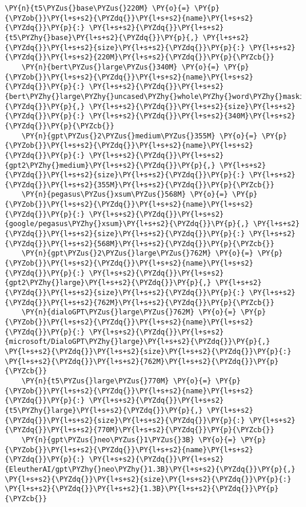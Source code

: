 \documentclass[11pt]{wseas}
\begin{document}
\begin{tcolorbox}[breakable, size=fbox, boxrule=1pt, pad at break*=1mm,colback=cellbackground, colframe=cellborder]
\begin{Verbatim}[commandchars=\\\{\}]
    \PY{n}{t5\PYZus{}base\PYZus{}220M} \PY{o}{=} \PY{p}{\PYZob{}}\PY{l+s+s2}{\PYZdq{}}\PY{l+s+s2}{name}\PY{l+s+s2}{\PYZdq{}}\PY{p}{:} \PY{l+s+s2}{\PYZdq{}}\PY{l+s+s2}{t5\PYZhy{}base}\PY{l+s+s2}{\PYZdq{}}\PY{p}{,} \PY{l+s+s2}{\PYZdq{}}\PY{l+s+s2}{size}\PY{l+s+s2}{\PYZdq{}}\PY{p}{:} \PY{l+s+s2}{\PYZdq{}}\PY{l+s+s2}{220M}\PY{l+s+s2}{\PYZdq{}}\PY{p}{\PYZcb{}}
    \PY{n}{bert\PYZus{}large\PYZus{}340M} \PY{o}{=} \PY{p}{\PYZob{}}\PY{l+s+s2}{\PYZdq{}}\PY{l+s+s2}{name}\PY{l+s+s2}{\PYZdq{}}\PY{p}{:} \PY{l+s+s2}{\PYZdq{}}\PY{l+s+s2}{bert\PYZhy{}large\PYZhy{}uncased\PYZhy{}whole\PYZhy{}word\PYZhy{}masking\PYZhy{}finetuned\PYZhy{}squad}\PY{l+s+s2}{\PYZdq{}}\PY{p}{,} \PY{l+s+s2}{\PYZdq{}}\PY{l+s+s2}{size}\PY{l+s+s2}{\PYZdq{}}\PY{p}{:} \PY{l+s+s2}{\PYZdq{}}\PY{l+s+s2}{340M}\PY{l+s+s2}{\PYZdq{}}\PY{p}{\PYZcb{}}
    \PY{n}{gpt\PYZus{}2\PYZus{}medium\PYZus{}355M} \PY{o}{=} \PY{p}{\PYZob{}}\PY{l+s+s2}{\PYZdq{}}\PY{l+s+s2}{name}\PY{l+s+s2}{\PYZdq{}}\PY{p}{:} \PY{l+s+s2}{\PYZdq{}}\PY{l+s+s2}{gpt2\PYZhy{}medium}\PY{l+s+s2}{\PYZdq{}}\PY{p}{,} \PY{l+s+s2}{\PYZdq{}}\PY{l+s+s2}{size}\PY{l+s+s2}{\PYZdq{}}\PY{p}{:} \PY{l+s+s2}{\PYZdq{}}\PY{l+s+s2}{355M}\PY{l+s+s2}{\PYZdq{}}\PY{p}{\PYZcb{}}
    \PY{n}{pegasus\PYZus{}xsum\PYZus{}568M} \PY{o}{=} \PY{p}{\PYZob{}}\PY{l+s+s2}{\PYZdq{}}\PY{l+s+s2}{name}\PY{l+s+s2}{\PYZdq{}}\PY{p}{:} \PY{l+s+s2}{\PYZdq{}}\PY{l+s+s2}{google/pegasus\PYZhy{}xsum}\PY{l+s+s2}{\PYZdq{}}\PY{p}{,} \PY{l+s+s2}{\PYZdq{}}\PY{l+s+s2}{size}\PY{l+s+s2}{\PYZdq{}}\PY{p}{:} \PY{l+s+s2}{\PYZdq{}}\PY{l+s+s2}{568M}\PY{l+s+s2}{\PYZdq{}}\PY{p}{\PYZcb{}}
    \PY{n}{gpt\PYZus{}2\PYZus{}large\PYZus{}762M} \PY{o}{=} \PY{p}{\PYZob{}}\PY{l+s+s2}{\PYZdq{}}\PY{l+s+s2}{name}\PY{l+s+s2}{\PYZdq{}}\PY{p}{:} \PY{l+s+s2}{\PYZdq{}}\PY{l+s+s2}{gpt2\PYZhy{}large}\PY{l+s+s2}{\PYZdq{}}\PY{p}{,} \PY{l+s+s2}{\PYZdq{}}\PY{l+s+s2}{size}\PY{l+s+s2}{\PYZdq{}}\PY{p}{:} \PY{l+s+s2}{\PYZdq{}}\PY{l+s+s2}{762M}\PY{l+s+s2}{\PYZdq{}}\PY{p}{\PYZcb{}}
    \PY{n}{dialoGPT\PYZus{}large\PYZus{}762M} \PY{o}{=} \PY{p}{\PYZob{}}\PY{l+s+s2}{\PYZdq{}}\PY{l+s+s2}{name}\PY{l+s+s2}{\PYZdq{}}\PY{p}{:} \PY{l+s+s2}{\PYZdq{}}\PY{l+s+s2}{microsoft/DialoGPT\PYZhy{}large}\PY{l+s+s2}{\PYZdq{}}\PY{p}{,} \PY{l+s+s2}{\PYZdq{}}\PY{l+s+s2}{size}\PY{l+s+s2}{\PYZdq{}}\PY{p}{:} \PY{l+s+s2}{\PYZdq{}}\PY{l+s+s2}{762M}\PY{l+s+s2}{\PYZdq{}}\PY{p}{\PYZcb{}}
    \PY{n}{t5\PYZus{}large\PYZus{}770M} \PY{o}{=} \PY{p}{\PYZob{}}\PY{l+s+s2}{\PYZdq{}}\PY{l+s+s2}{name}\PY{l+s+s2}{\PYZdq{}}\PY{p}{:} \PY{l+s+s2}{\PYZdq{}}\PY{l+s+s2}{t5\PYZhy{}large}\PY{l+s+s2}{\PYZdq{}}\PY{p}{,} \PY{l+s+s2}{\PYZdq{}}\PY{l+s+s2}{size}\PY{l+s+s2}{\PYZdq{}}\PY{p}{:} \PY{l+s+s2}{\PYZdq{}}\PY{l+s+s2}{770M}\PY{l+s+s2}{\PYZdq{}}\PY{p}{\PYZcb{}}
    \PY{n}{gpt\PYZus{}neo\PYZus{}1\PYZus{}3B} \PY{o}{=} \PY{p}{\PYZob{}}\PY{l+s+s2}{\PYZdq{}}\PY{l+s+s2}{name}\PY{l+s+s2}{\PYZdq{}}\PY{p}{:} \PY{l+s+s2}{\PYZdq{}}\PY{l+s+s2}{EleutherAI/gpt\PYZhy{}neo\PYZhy{}1.3B}\PY{l+s+s2}{\PYZdq{}}\PY{p}{,} \PY{l+s+s2}{\PYZdq{}}\PY{l+s+s2}{size}\PY{l+s+s2}{\PYZdq{}}\PY{p}{:} \PY{l+s+s2}{\PYZdq{}}\PY{l+s+s2}{1.3B}\PY{l+s+s2}{\PYZdq{}}\PY{p}{\PYZcb{}}


\end{Verbatim}
\end{tcolorbox}
\end{document}
